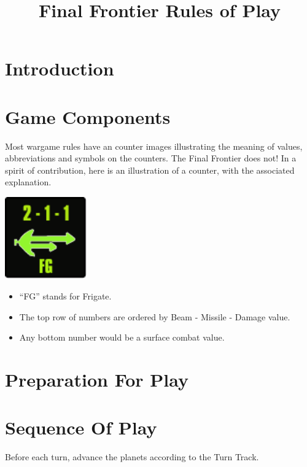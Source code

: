 \documentclass[10pt]{article}
\title{Final Frontier Rules of Play}
\begin{document}
\maketitle


\tableofcontents


\begin{multicols}{2}

\section{Introduction}
\section{Game Components}

Most wargame rules have an counter images illustrating the meaning of values,
abbreviations and symbols on the counters. The Final Frontier does not! In a
spirit of contribution, here is an illustration of a counter, with the associated
explanation.

\begin{center}
  \includegraphics[width=100pt]{../../source/images/final-frontier-frigate.pdf}
\end{center}

\begin{itemize}
  \item ``FG'' stands for Frigate.
  \item The top row of numbers are ordered by Beam - Missile - Damage value.
  \item Any bottom number would be a surface combat value.
\end{itemize}

\section{Preparation For Play}
\section{Sequence Of Play}

Before each turn, advance the planets according to the Turn Track.


\end{multicols}
\end{document}
